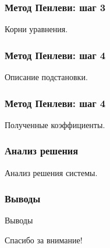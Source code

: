 \documentclass[14pt]{beamer}
\begin{document}
\begin{frame}

\frametitle{Метод Пенлеви: шаг 3}

Корни уравнения.

\end{frame}



\begin{frame}

\frametitle{Метод Пенлеви: шаг 4}

Описание подстановки.

\end{frame}


\begin{frame}

\frametitle{Метод Пенлеви: шаг 4}

Полученные коэффициенты.

\end{frame}


\begin{frame}

\frametitle{Анализ решения}

Анализ решения системы.

\end{frame}

\begin{frame}

\frametitle{Выводы}

Выводы

\end{frame}


\begin{frame}
\begin{center}
Спасибо за внимание!
\end{center}
\end{frame}
\end{document}
